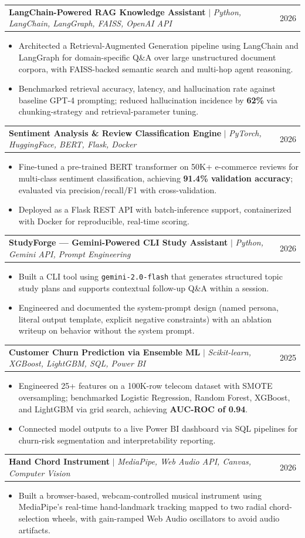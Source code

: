 \documentclass[letterpaper,10.5pt]{article}
\makeatletter
\newcommand{\resumeItem}[1]{
  \item\small{#1 \vspace{-2pt}}
}
\newcommand{\resumeProjectHeading}[2]{
    \item
    \begin{tabular*}{0.97\textwidth}{l@{\extracolsep{\fill}}r}
      \small#1 & \small #2 \\
    \end{tabular*}\vspace{-5pt}
}
\newcommand{\resumeItemListStart}{\begin{itemize}[leftmargin=0.18in]}
\newcommand{\resumeItemListEnd}{\end{itemize}\vspace{-4pt}}
\makeatother
\begin{document}
  \resumeProjectHeading
    {\textbf{LangChain-Powered RAG Knowledge Assistant} $|$ \textit{Python, LangChain, LangGraph, FAISS, OpenAI API}}{2026}
    \resumeItemListStart
      \resumeItem{Architected a Retrieval-Augmented Generation pipeline using LangChain and LangGraph for domain-specific Q\&A over large unstructured document corpora, with FAISS-backed semantic search and multi-hop agent reasoning.}
      \resumeItem{Benchmarked retrieval accuracy, latency, and hallucination rate against baseline GPT-4 prompting; reduced hallucination incidence by \textbf{62\%} via chunking-strategy and retrieval-parameter tuning.}
    \resumeItemListEnd

  \resumeProjectHeading
    {\textbf{Sentiment Analysis \& Review Classification Engine} $|$ \textit{PyTorch, HuggingFace, BERT, Flask, Docker}}{2026}
    \resumeItemListStart
      \resumeItem{Fine-tuned a pre-trained BERT transformer on 50K+ e-commerce reviews for multi-class sentiment classification, achieving \textbf{91.4\% validation accuracy}; evaluated via precision/recall/F1 with cross-validation.}
      \resumeItem{Deployed as a Flask REST API with batch-inference support, containerized with Docker for reproducible, real-time scoring.}
    \resumeItemListEnd

  \resumeProjectHeading
    {\textbf{StudyForge --- Gemini-Powered CLI Study Assistant} $|$ \textit{Python, Gemini API, Prompt Engineering}}{2026}
    \resumeItemListStart
      \resumeItem{Built a CLI tool using \texttt{gemini-2.0-flash} that generates structured topic study plans and supports contextual follow-up Q\&A within a session.}
      \resumeItem{Engineered and documented the system-prompt design (named persona, literal output template, explicit negative constraints) with an ablation writeup on behavior without the system prompt.}
    \resumeItemListEnd

  \resumeProjectHeading
    {\textbf{Customer Churn Prediction via Ensemble ML} $|$ \textit{Scikit-learn, XGBoost, LightGBM, SQL, Power BI}}{2025}
    \resumeItemListStart
      \resumeItem{Engineered 25+ features on a 100K-row telecom dataset with SMOTE oversampling; benchmarked Logistic Regression, Random Forest, XGBoost, and LightGBM via grid search, achieving \textbf{AUC-ROC of 0.94}.}
      \resumeItem{Connected model outputs to a live Power BI dashboard via SQL pipelines for churn-risk segmentation and interpretability reporting.}
    \resumeItemListEnd

  \resumeProjectHeading
    {\textbf{Hand Chord Instrument} $|$ \textit{MediaPipe, Web Audio API, Canvas, Computer Vision}}{2026}
    \resumeItemListStart
      \resumeItem{Built a browser-based, webcam-controlled musical instrument using MediaPipe's real-time hand-landmark tracking mapped to two radial chord-selection wheels, with gain-ramped Web Audio oscillators to avoid audio artifacts.}
    \resumeItemListEnd
\end{document}
